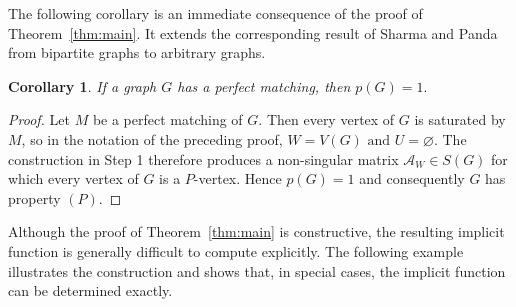 \documentclass[12pt,reqno]{amsart}
\theoremstyle{plain}
\newtheorem{cor}{Corollary}
\theoremstyle{definition}
\theoremstyle{block}
\theoremstyle{remark}
\numberwithin{equation}{section}
\begin{document}
The following corollary is an immediate consequence of the proof of Theorem~\ref{thm:main}. It extends the corresponding result of Sharma and Panda \cite[Theorem 3.1]{sharma} from bipartite graphs to arbitrary graphs.

\begin{cor}
If a graph \(G\) has a perfect matching, then
\(
p(G)=1.
\)
\end{cor}

\begin{proof}
Let \(M\) be a perfect matching of \(G\). Then every vertex of \(G\)
is saturated by \(M\), so in the notation of the preceding proof,
\(
W=V(G)
\text{ and }
U=\varnothing.
\)
The construction in Step 1 therefore produces a non-singular matrix
\(\mathcal A_W\in S(G)\) for which every vertex of \(G\) is a
\(P\)-vertex. Hence \(
p(G)=1
\) and consequently \(G\) has property \((P)\).

\end{proof}



Although the proof of Theorem~\ref{thm:main} is constructive, the resulting implicit function is generally difficult to compute explicitly. The following example illustrates the construction and shows that, in special cases, the implicit function can be determined exactly.
\end{document}

